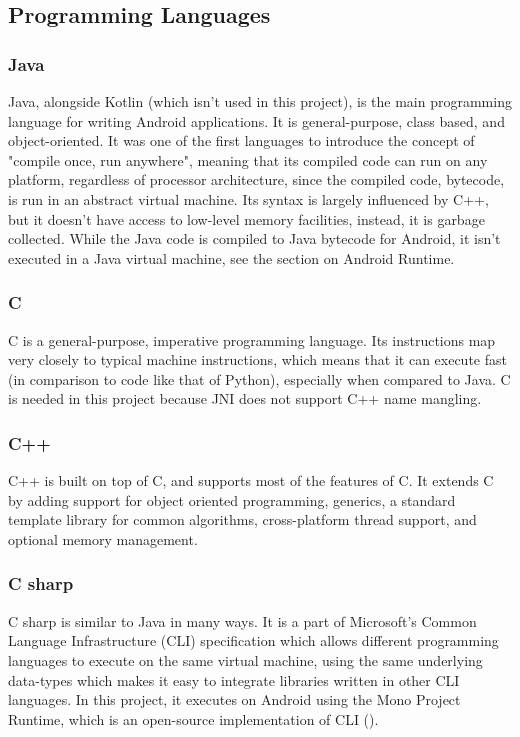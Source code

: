     \subsection{Programming Languages}
        \subsubsection{Java}
        Java, alongside Kotlin (which isn't used in this project), is the main programming language for writing Android applications. It is general-purpose, class based, and object-oriented. It was one of the first languages to introduce the concept of "compile once, run anywhere", meaning that its compiled code can run on any platform, regardless of processor architecture, since the compiled code, bytecode, is run in an abstract virtual machine. Its syntax is largely influenced by C++, but it doesn't have access to low-level memory facilities, instead, it is garbage collected. While the Java code is compiled to Java bytecode for Android, it isn't executed in a Java virtual machine, see the section on Android Runtime.
        \subsubsection{C}
        C is a general-purpose, imperative programming language. Its instructions map very closely to typical machine instructions, which means that it can execute fast (in comparison to code like that of Python), especially when compared to Java. C is needed in this project because JNI does not support C++ name mangling.
        \subsubsection{C++}
        C++ is built on top of C, and supports most of the features of C. It extends C by adding support for object oriented programming, generics, a standard template library for common algorithms, cross-platform thread support, and optional memory management.
        \subsubsection{C sharp}
        C sharp is similar to Java in many ways. It is a part of Microsoft's Common Language Infrastructure (CLI) specification which allows different programming languages to execute on the same virtual machine, using the same underlying data-types which makes it easy to integrate libraries written in other CLI languages. In this project, it executes on Android using the Mono Project Runtime, which is an open-source implementation of CLI (\cite{monoproject}).

